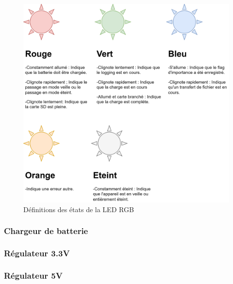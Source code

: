 {{		\begin{figure}[h]
			\centering
			\includegraphics[width=0.95\linewidth]{Figures/Dev-SCH/LEDStates}
			\caption{Définitions des états de la LED RGB}
			\label{fig:ledstates}
		\end{figure}
		
	}

	\clearpage
	\subsubsection{Chargeur de batterie} \label{sssec:BatCharger}
	{
		
	}
	
	\subsubsection{Régulateur 3.3V} \label{sssec:Reg3V3}
	{
		
	}
	
	\subsubsection{Régulateur 5V} \label{sssec:Reg5V}
	{
		
	}
	

}


\clearpage